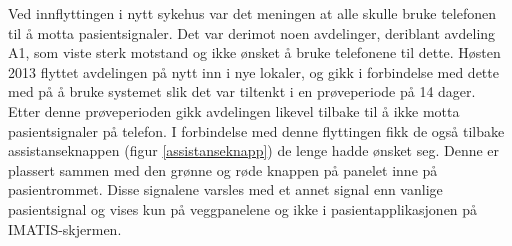 \noindent
Ved innflyttingen i nytt sykehus var det meningen at alle skulle bruke telefonen til å motta pasientsignaler. Det var derimot noen avdelinger, deriblant avdeling A1, som viste sterk motstand og ikke ønsket å bruke telefonene til dette.
Høsten 2013 flyttet avdelingen på nytt inn i nye lokaler, og gikk i forbindelse med dette med på å bruke systemet slik det var tiltenkt i en prøveperiode på 14 dager. Etter denne prøveperioden gikk avdelingen likevel tilbake til å ikke motta pasientsignaler på telefon. 
I forbindelse med denne flyttingen fikk de også tilbake assistanseknappen (figur \ref{assistanseknapp}) de lenge hadde ønsket seg. Denne er plassert sammen med den grønne og røde knappen på panelet inne på pasientrommet. Disse signalene varsles med et annet signal enn vanlige pasientsignal og vises kun på veggpanelene og ikke i pasientapplikasjonen på IMATIS-skjermen.